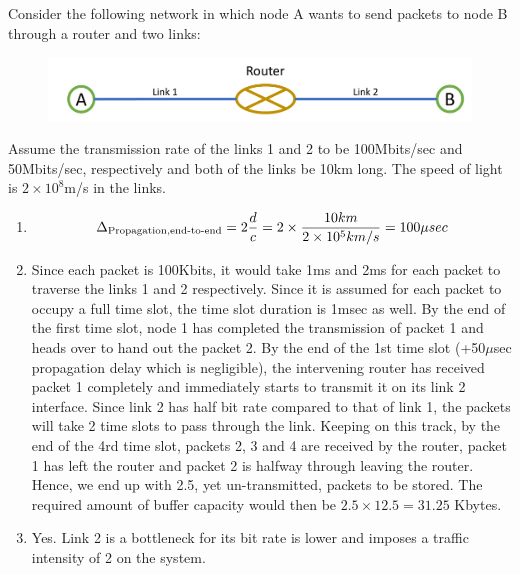 \documentclass[10pt,letterpaper]{article}
\begin{document}
Consider the following network in which node A wants to send packets to node B through a router and two links:
\begin{figure}[ht]
\centering
\includegraphics[width=140mm]{p2p}
\end{figure}
Assume the transmission rate of the links 1 and 2 to be 100Mbits/sec and 50Mbits/sec, respectively and both of the links be 10km long. The speed of light is $2\times 10^8$m/s in the links.
\begin{enumerate}[label=\alph*-]
\item
$$\Delta_\text{Propagation,end-to-end}=2{d\over c}=2\times{10km\over 2\times 10^5 km/s}=100\mu sec$$
\item
Since each packet is 100Kbits, it would take 1ms and 2ms for each packet to traverse the links 1 and 2 respectively. Since it is assumed for each packet to occupy a full time slot, the time slot duration is 1msec as well. By the end of the first time slot, node 1 has completed the transmission of packet 1 and heads over to hand out the packet 2. By the end of the 1st time slot (+50$\mu$sec propagation delay which is negligible), the intervening router has received packet 1 completely and immediately starts to transmit it on its link 2 interface. Since link 2 has half bit rate compared to that of link 1, the packets will take 2 time slots to pass through the link. Keeping on this track, by the end of the 4rd time slot, packets 2, 3 and 4 are received by the router, packet 1 has left the router and packet 2 is halfway through leaving the router. Hence, we end up with 2.5, yet un-transmitted, packets to be stored. The required amount of buffer capacity would then be $2.5\times 12.5=31.25$ Kbytes.
\item
Yes. Link 2 is a bottleneck for its bit rate is lower and imposes a traffic intensity of 2 on the system.
\end{enumerate}
\end{document}
